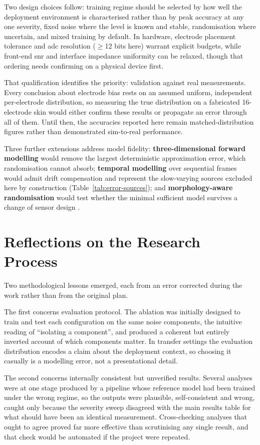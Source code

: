 Two design choices follow: training regime should be selected by how well the deployment environment is characterised rather than by peak accuracy at any one severity, fixed noise where the level is known and stable, randomisation where uncertain, and mixed training by default. In hardware, electrode placement tolerance and \gls{adc} resolution ($\geq$12 bits here) warrant explicit budgets, while front-end \gls{snr} and interface impedance uniformity can be relaxed, though that ordering needs confirming on a physical device first.

That qualification identifies the priority: validation against real measurements. Every conclusion about electrode bias rests on an assumed uniform, independent per-electrode distribution, so measuring the true distribution on a fabricated 16-electrode skin would either confirm these results or propagate an error through all of them. Until then, the accuracies reported here remain matched-distribution figures rather than demonstrated sim-to-real performance.

Three further extensions address model fidelity: \textbf{three-dimensional forward modelling} would remove the largest deterministic approximation error, which randomisation cannot absorb; \textbf{temporal modelling} over sequential frames would admit drift compensation and represent the slow-varying sources excluded here by construction (Table~\ref{tab:error-sources}); and \textbf{morphology-aware randomisation} would test whether the minimal sufficient model survives a change of sensor design \parencite{dong2025lattice}.


\section{Reflections on the Research Process}
\label{sec:conc-reflections}

Two methodological lessons emerged, each from an error corrected during the work rather than from the original plan.

The first concerns evaluation protocol. The ablation was initially designed to train and test each configuration on the same noise components, the intuitive reading of ``isolating a component'', and produced a coherent but entirely inverted account of which components matter. In transfer settings the evaluation distribution encodes a claim about the deployment context, so choosing it casually is a modelling error, not a presentational detail.

The second concerns internally consistent but unverified results. Several analyses were at one stage produced by a pipeline whose reference model had been trained under the wrong regime, so the outputs were plausible, self-consistent and wrong, caught only because the severity sweep disagreed with the main results table for what should have been an identical measurement. Cross-checking analyses that ought to agree proved far more effective than scrutinising any single result, and that check would be automated if the project were repeated.

